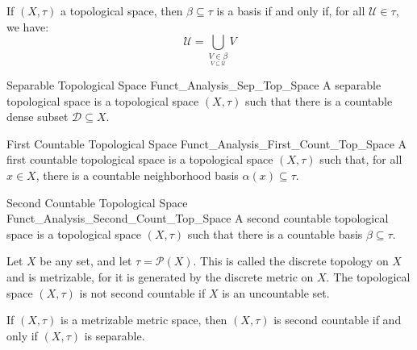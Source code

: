             \begin{theorem}
                If $(X,\tau)$ a topological space, then
                $\beta\subseteq\tau$ is a basis if and only if,
                for all $\mathcal{U}\in\tau$, we have:
                \begin{equation}
                    \mathcal{U}=
                    \bigcup_{\underset{V\subseteq\mathcal{U}}
                        {V\in\beta}}V
                \end{equation}
            \end{theorem}
            \begin{ldefinition}{Separable Topological Space}
                  {Funct_Analysis_Sep_Top_Space}
                A separable topological space is a topological
                space $(X,\tau)$ such that there is a countable
                dense subset $\mathcal{D}\subseteq{X}$.
            \end{ldefinition}
            \begin{ldefinition}{First Countable Topological Space}
                  {Funct_Analysis_First_Count_Top_Space}
                A first countable topological space is a
                topological space $(X,\tau)$ such that, for
                all $x\in{X}$, there is a countable neighborhood
                basis $\alpha(x)\subseteq\tau$.
            \end{ldefinition}
            \begin{ldefinition}{Second Countable Topological Space}
                  {Funct_Analysis_Second_Count_Top_Space}
                A second countable topological space is a
                topological space $(X,\tau)$ such that there is
                a countable basis $\beta\subseteq\tau$.
            \end{ldefinition}
            \begin{lexample}
                Let $X$ be any set, and let $\tau=\mathcal{P}(X)$.
                This is called the discrete topology on $X$
                and is metrizable, for it is generated by the
                discrete metric on $X$. The topological space
                $(X,\tau)$ is not second countable if $X$ is an
                uncountable set.
            \end{lexample}
            \begin{theorem}
                If $(X,\tau)$ is a metrizable metric space, then
                $(X,\tau)$ is second countable if and only if
                $(X,\tau)$ is separable.
            \end{theorem}
